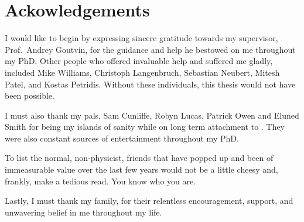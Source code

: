 \clearpage
\chapter*{\centering Ackowledgements}
\begin{center}
  {\setlength{\currentparskip}{\parskip}%
  \begin{minipage}{\abstractpagewidth}
    \setlength{\parskip}{\currentparskip}%
    I would like to begin by expressing sincere gratitude towards my supervisor, Prof.~Andrey
    Goutvin, for the guidance and help he bestowed on me throughout my PhD.
    Other people who offered invaluable help and suffered me gladly, included
    Mike Williams, Christoph Langenbruch, Sebastian Neubert, Mitesh Patel, and
    Kostas Petridis.
    Without these individuals, this thesis would not have been possible.

    I must also thank my pals, Sam Cunliffe, Robyn Lucas, Patrick Owen and Eluned Smith for being
    my islands of sanity while on long
    term attachment to \cern.
    They were also constant sources of entertainment throughout my PhD.

    To list the normal, non-physicist, friends that have popped up and been of immeasurable value
    over the last few years would not be a little cheesy and, frankly, make a tedious read.
    You know who you are.

    Lastly, I must thank my family, for their relentless encouragement, support, and
    unwavering belief in me throughout my life.

  \end{minipage}}
\end{center}



